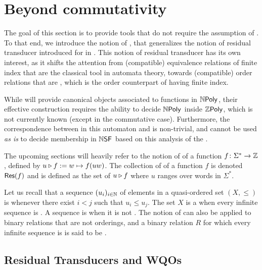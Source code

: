\section{Beyond commutativity}
\label{beyond-commutative:sec}

The goal of this section is to provide tools that do not require the assumption
of . To that end, we introduce the notion of , that generalizes the notion of residual transducer introduced for
 in \cite{LOPEZ23b}. This notion of residual
transducer has its own interest, as it shifts the attention from (compatible)
equivalence relations of finite index that are the classical tool in automata
theory, towards (compatible) order relations that are ,
which is the order counterpart of having finite index.

While  will provide canonical objects associated
to functions in $\NPoly$, their effective construction requires the ability to
decide $\NPoly$ inside $\ZPoly$, which is not currently known (except in the
commutative case). Furthermore, the correspondence between  in
this automaton and  is non-trivial,
and cannot be used \emph{as is} to decide membership in $\NSF$
based on this analysis of the .

\AP The upcoming sections will heavily refer to the notion of  of
a function $f \colon \Sigma^* \to \Rel$,  defined by $\app{f}{u} \defined w
\mapsto f(uw)$. The collection of  of a function $f$ is
denoted $\Res(f)$ and is defined as the set of $\app{f}{u}$ where $u$ ranges
over words in $\Sigma^*$.

\AP Let us recall that a sequence $\seqof{u_i}{i \in \Nat}$ of elements in a
quasi-ordered set $(X, \leq)$ is  whenever there exist $i < j$ such
that $u_i \leq u_j$. The set $X$ is a  when every
infinite sequence is . A sequence is  when it is not
. The notion of  can also be applied to
binary relations that are not orderings, and a binary relation $R$ for which
every infinite sequence is  is said to be 
\cite{MELL98}.

\subsection{Residual Transducers and WQOs}

